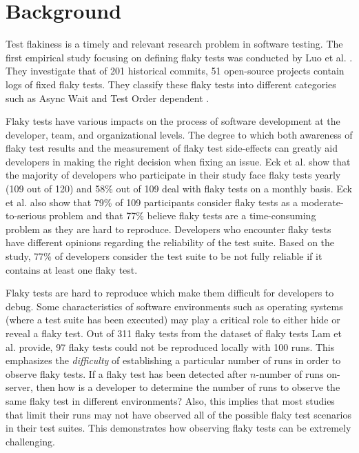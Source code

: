 \section{Background}
\label{sec:background}


Test flakiness is a timely and relevant research problem in software testing. The first empirical study focusing on defining flaky tests was conducted by Luo et al. \cite{luo2014empirical}. They investigate that of 201 historical commits, 51 open-source projects contain logs of fixed flaky tests. They classify these flaky tests into different categories such as Async Wait and Test Order dependent \cite{luo2014empirical}.   

Flaky tests have various impacts on the process of software development at the developer, team, and organizational levels. The degree to which both awareness of flaky test results and the measurement of flaky test side-effects can greatly aid developers in making the right decision when fixing an issue. Eck et al. \cite{eck2019understanding} show that the majority of developers who participate in their study face flaky tests yearly (109 out of 120) and 58\% out of 109 deal with flaky tests on a monthly basis. Eck et al. \cite{eck2019understanding} also show that 79\% of 109 participants consider flaky tests as a moderate-to-serious problem and that 77\% believe flaky tests are a time-consuming problem as they are hard to reproduce. Developers who encounter flaky tests have different opinions regarding the reliability of the test suite. Based on the study, 77\% of developers consider the test suite to be not fully reliable if it contains at least one flaky test.


Flaky tests are hard to reproduce which make them difficult for developers to debug. Some characteristics of software environments such as operating systems (where a test suite has been executed) may play a critical role to either hide or reveal a flaky test. Out of 311 flaky tests from the dataset of flaky tests Lam et al. \cite{lam2019root} provide, 97 flaky tests could not be reproduced locally with 100 runs. This emphasizes the \emph{difficulty} of establishing a particular number of runs in order to observe flaky tests. If a flaky test has been detected after $n$-number of runs on-server, then how is a developer to determine the number of runs to observe the same flaky test in different environments? Also, this implies that most studies that limit their runs may not have observed all of the possible flaky test scenarios in their test suites. This demonstrates how observing flaky tests can be extremely challenging.


